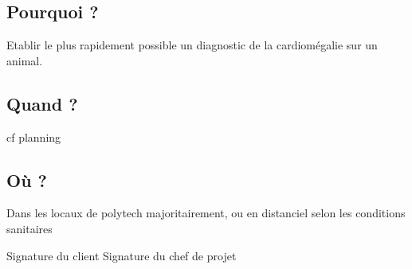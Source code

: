 \documentclass[a4paper, 11pt]{report}
\begin{document}
\subsection*{Pourquoi ?}
Etablir le plus rapidement possible un diagnostic de la cardiomégalie sur un animal.

\subsection*{Quand  ?}
cf planning


\subsection*{Où ?}
Dans les locaux de polytech majoritairement, ou en distanciel selon les conditions sanitaires

\vspace*{5cm}


\begin{center}
Signature du client \hspace{2.5cm} Signature du chef de projet
\end{center}
\end{document}
